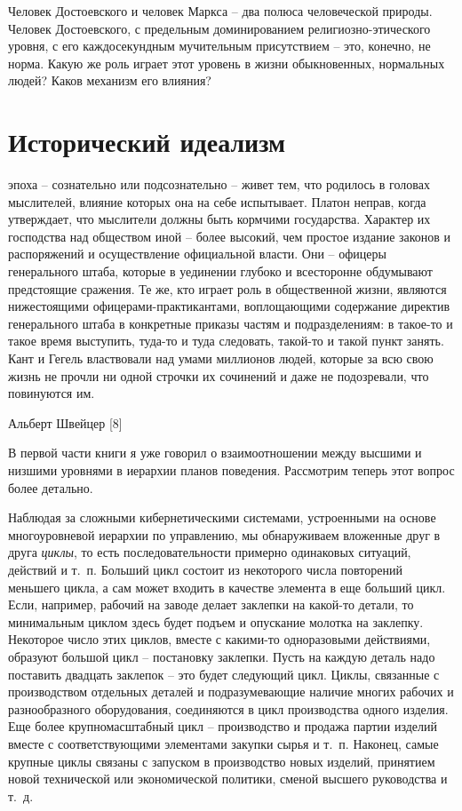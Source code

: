 \documentclass{book}
\begin{document}
Человек Достоевского и человек Маркса -- два полюса чело­веческой природы. Человек Достоевского, с предельным доми­нированием религиозно-этического уровня, с его каждосекундным мучительным присутствием -- это, конечно, не норма. Какую же роль играет этот уровень в жизни обыкновенных, нормальных людей? Каков механизм его влияния?



\section{Исторический идеализм}

\epigraph{ эпоха -- сознательно или подсознательно -- живет тем, что родилось в головах мыслителей, влияние которых она на себе испытывает.
Платон неправ, когда утверждает, что мыслители должны быть кормчими государства. Характер их господства над обществом иной -- более высокий, чем простое издание законов и распоряжений и осуществление официальной власти. Они -- офицеры генерального штаба, которые в уединении глубоко и всесторонне обдумывают предстоящие сражения. Те же, кто играет роль в общественной жизни, являются нижестоящими офицерами-практикантами, воплощающими содержание директив генерального штаба в конкретные приказы частям и подразделениям: в такое-то и такое время выступить, туда-то и туда следовать, такой-то и такой пункт занять. Кант и Гегель властвовали над умами миллионов людей, которые за всю свою жизнь не прочли ни одной строчки их сочинений и даже не подозревали, что повинуются им.}{Альберт Швейцер [8]}

В первой части книги я уже говорил о взаимоотношении между высшими и низшими уровнями в иерархии планов поведения. Рассмотрим теперь этот вопрос более детально.

Наблюдая за сложными кибернетическими системами, устроенными на основе многоуровневой иерархии по управлению, мы обнаруживаем вложенные друг в друга \textit{циклы},  то есть последовательности примерно одинаковых ситуаций, действий и т.~п. Больший цикл состоит из некоторого числа повторений меньшего цикла, а сам может входить в качестве элемента в еще больший цикл. Если, например, рабочий на заводе делает заклепки на какой-то детали, то минимальным циклом здесь будет подъем и опускание молотка на заклепку. Некоторое число этих циклов, вместе с какими-то одноразовыми действиями, образуют большой цикл -- постановку заклепки. Пусть на каждую деталь надо поставить двадцать заклепок -- это будет следующий цикл. Циклы, связанные с производством отдельных деталей и подразумевающие наличие многих рабочих и разнообразного оборудования, соединяются в цикл произ­водства одного изделия. Еще более крупномасштабный цикл -- производство и продажа партии изделий вместе с соответствую­щими элементами закупки сырья и т.~п. Наконец, 
самые крупные циклы связаны с запуском в производство новых изделий, принятием новой технической или экономической политики, сменой высшего руководства и т.~д.
\end{document}
